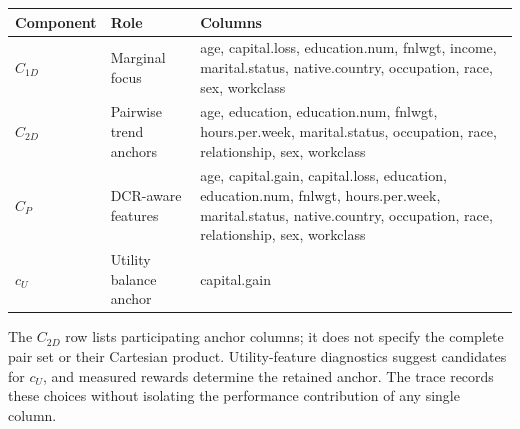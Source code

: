 \documentclass[conference]{IEEEtran}
\begin{document}
\par\medskip\noindent\begin{minipage}{\textwidth}
\centering
{}
\label{supp:adult-policy}
\small
\begin{tabularx}{\textwidth}{@{}p{}p{}X@{}}
\toprule
Component & Role & Columns\\
\midrule
$C_{1D}$ & Marginal focus & age, capital.loss, education.num, fnlwgt, income, marital.status, native.country, occupation, race, sex, workclass\\
$C_{2D}$ & Pairwise trend anchors & age, education, education.num, fnlwgt, hours.per.week, marital.status, occupation, race, relationship, sex, workclass\\
$C_P$ & DCR-aware features & age, capital.gain, capital.loss, education, education.num, fnlwgt, hours.per.week, marital.status, native.country, occupation, race, relationship, sex, workclass\\
$c_U$ & Utility balance anchor & capital.gain\\
\bottomrule
\end{tabularx}
\end{minipage}\par\medskip

The $C_{2D}$ row lists participating anchor columns; it does not specify the complete pair set or their Cartesian product. Utility-feature diagnostics suggest candidates for $c_U$, and measured rewards determine the retained anchor. The trace records these choices without isolating the performance contribution of any single column.
\end{document}
